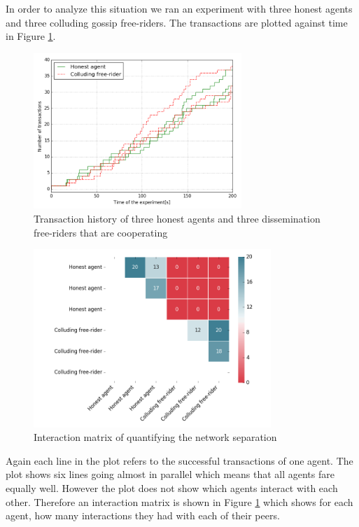 In order to analyze this situation we ran an experiment with three honest agents and three colluding gossip 
free-riders. The transactions are plotted against time in Figure \ref{fig:50percent}.

\begin{figure}[h!]
    \centering
    \includegraphics[width=0.7\textwidth]{images/50percent}
    \caption{Transaction history of three honest agents and three dissemination free-riders
    that are cooperating}
    \label{fig:50percent}
\end{figure}

\begin{figure}[h!]
    \centering
    \includegraphics[width=0.8\textwidth]{images/50percent_interaction_matrix}
    \caption{Interaction matrix of quantifying the network separation}
    \label{fig:50percent_matrix}
\end{figure}

Again each line in the plot refers to the successful transactions of one agent. The plot shows six 
lines going almost in parallel which means that all agents fare equally well. However the plot does
not show which agents interact with each other. Therefore an interaction matrix is shown in Figure 
\ref{fig:50percent} which shows for each agent, how many interactions they had with each of their 
peers. 

